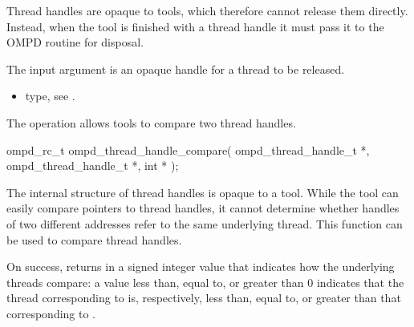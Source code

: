 \descr
Thread handles are opaque to tools, which therefore cannot release them directly.
Instead, when the tool is finished with a thread handle it must pass it to the OMPD 
 routine for disposal.

\argdesc
The input argument  is an opaque handle for a thread
to be released.

\crossreferences
\begin{itemize}
	\item {} type, see .
\end{itemize}


\label{ompd:ompd_thread_handle_compare}
\summary
The  operation allows tools to compare 
two thread handles.

\format

\begin{cspecific}
\begin{ompSyntax}
ompd_rc_t ompd_thread_handle_compare(
  ompd_thread_handle_t *,
  ompd_thread_handle_t *,
  int *
);
\end{ompSyntax}
\end{cspecific}


\descr
The internal structure of thread handles is opaque to a tool. While the tool can easily compare 
pointers to thread handles, it cannot determine whether handles of two different addresses
refer to the same underlying thread. This function can be used to compare thread handles.

On success,  returns in  a signed 
integer value that indicates how the underlying threads compare: a value less than, equal to, or 
greater than 0 indicates that the thread corresponding to  is, respectively, 
less than, equal to, or greater than that corresponding to .


%

